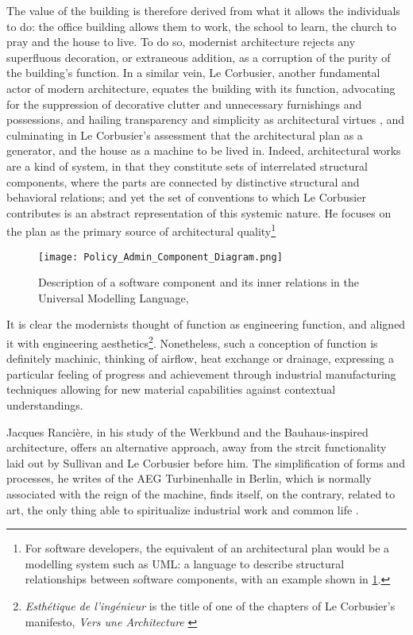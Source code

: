 The value of the building is therefore derived from what it allows the individuals to do: the office building allows them to work, the school to learn, the church to pray and the house to live. To do so, modernist architecture rejects any superfluous decoration, or extraneous addition, as a corruption of the purity of the building's function. In a similar vein, Le Corbusier, another fundamental actor of modern architecture, equates the building with its function, advocating for the suppression of decorative clutter and unnecessary furnishings and possessions, and hailing transparency and simplicity as architectural virtues \citep{lecorbusier_vers_1923}, and culminating in Le Corbusier's assessment that the architectural plan as a generator, and the house as a machine to be lived in. Indeed, architectural works are a kind of system, in that they constitute sets of interrelated structural components, where the parts are connected by distinctive structural and behavioral relations; and yet the set of conventions to which Le Corbusier contributes is an abstract representation of this systemic nature. He focuses on the plan as the primary source of architectural quality\footnote{For software developers, the equivalent of an architectural plan would be a modelling system such as UML: a language to describe structural relationships between software components, with an example shown in \ref{graphic:uml}.}

\begin{figure}
    \texttt{[image: Policy\_Admin\_Component\_Diagram.png]}
    \caption{Description of a software component and its inner relations in the Universal Modelling Language, \citep{wikipedia_unified_2023}}
    \label{graphic:uml}
\end{figure}

It is clear the modernists thought of function as engineering function, and aligned it with engineering aesthetics\footnote{\emph{Esthétique de l'ingénieur} is the title of one of the chapters of Le Corbusier's manifesto, \emph{Vers une Architecture} \citep{lecorbusier_vers_1923}}. Nonetheless, such a conception of function is definitely machinic, thinking of airflow, heat exchange or drainage, expressing a particular feeling of progress and achievement through industrial manufacturing techniques allowing for new material capabilities against contextual understandings.

Jacques Rancière, in his study of the Werkbund and the Bauhaus-inspired architecture, offers an alternative approach, away from the strcit functionality laid out by Sullivan and Le Corbusier before him. The simplification of forms and processes, he writes of the AEG Turbinenhalle in Berlin, which is normally associated with the reign of the machine, finds itself, on the contrary, related to art, the only thing able to spiritualize industrial work and common life \citep{ranciere_aisthesis_2013}.

